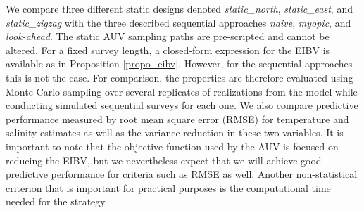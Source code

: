 \documentclass[aoas]{imsart}
\begin{document}
We compare three different static designs denoted
\textit{static\_north}, \textit{static\_east}, and
\textit{static\_zigzag} with the three described sequential approaches
\textit{naive}, \textit{myopic}, and \textit{look-ahead}. The static
AUV sampling paths are pre-scripted and cannot be altered.
For a fixed survey length, a closed-form expression for the EIBV is
available as in Proposition \ref{propo_eibv}. However, for the sequential
approaches this is not the case. For comparison, the properties are
therefore evaluated using Monte Carlo sampling over several replicates
of realizations from the model while conducting simulated sequential
surveys for each one. We also compare predictive
performance measured by root mean square error (RMSE) for temperature
and salinity estimates as well as the variance reduction in these
two variables. It is important to note that the objective function
used by the AUV is focused on reducing the
EIBV, but we nevertheless expect that we will achieve good predictive
performance for criteria such as RMSE as well. Another non-statistical
criterion that is important for practical purposes is the computational
time needed for the strategy.

\end{document}
